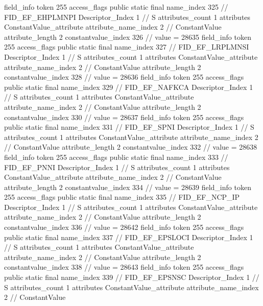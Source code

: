 {{{{{{				}
			}
			field_info {
				token	255
				access_flags	public static final
				name_index	325		// FID_EF_EHPLMNPI
				Descriptor_Index	1		// S
				attributes_count	1
				attributes {
				ConstantValue_attribute {
					attribute_name_index	2		// ConstantValue
					attribute_length	2
					constantvalue_index	326		// value = 28635
				}
				}
			}
			field_info {
				token	255
				access_flags	public static final
				name_index	327		// FID_EF_LRPLMNSI
				Descriptor_Index	1		// S
				attributes_count	1
				attributes {
				ConstantValue_attribute {
					attribute_name_index	2		// ConstantValue
					attribute_length	2
					constantvalue_index	328		// value = 28636
				}
				}
			}
			field_info {
				token	255
				access_flags	public static final
				name_index	329		// FID_EF_NAFKCA
				Descriptor_Index	1		// S
				attributes_count	1
				attributes {
				ConstantValue_attribute {
					attribute_name_index	2		// ConstantValue
					attribute_length	2
					constantvalue_index	330		// value = 28637
				}
				}
			}
			field_info {
				token	255
				access_flags	public static final
				name_index	331		// FID_EF_SPNI
				Descriptor_Index	1		// S
				attributes_count	1
				attributes {
				ConstantValue_attribute {
					attribute_name_index	2		// ConstantValue
					attribute_length	2
					constantvalue_index	332		// value = 28638
				}
				}
			}
			field_info {
				token	255
				access_flags	public static final
				name_index	333		// FID_EF_PNNI
				Descriptor_Index	1		// S
				attributes_count	1
				attributes {
				ConstantValue_attribute {
					attribute_name_index	2		// ConstantValue
					attribute_length	2
					constantvalue_index	334		// value = 28639
				}
				}
			}
			field_info {
				token	255
				access_flags	public static final
				name_index	335		// FID_EF_NCP_IP
				Descriptor_Index	1		// S
				attributes_count	1
				attributes {
				ConstantValue_attribute {
					attribute_name_index	2		// ConstantValue
					attribute_length	2
					constantvalue_index	336		// value = 28642
				}
				}
			}
			field_info {
				token	255
				access_flags	public static final
				name_index	337		// FID_EF_EPSLOCI
				Descriptor_Index	1		// S
				attributes_count	1
				attributes {
				ConstantValue_attribute {
					attribute_name_index	2		// ConstantValue
					attribute_length	2
					constantvalue_index	338		// value = 28643
				}
				}
			}
			field_info {
				token	255
				access_flags	public static final
				name_index	339		// FID_EF_EPSNSC
				Descriptor_Index	1		// S
				attributes_count	1
				attributes {
				ConstantValue_attribute {
					attribute_name_index	2		// ConstantValue
}}}}}}}
